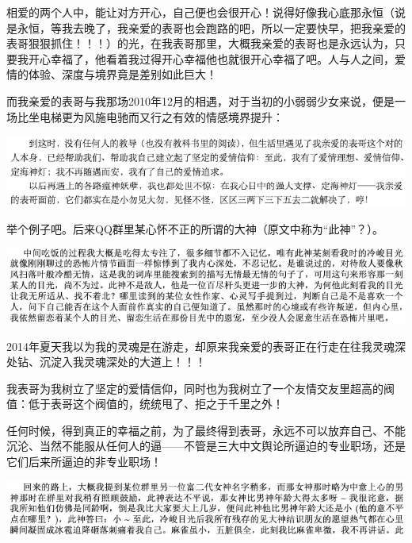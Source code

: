 \documentclass[9pt, b5paper]{article}
\begin{document}
相爱的两个人中，能让对方开心，自己便也会很开心！说得好像我心底那永恒（说是永恒，等我去晚了，我亲爱的表哥也会跑路的吧，所以一定要快早，把我亲爱的表哥狠狠抓住！！！）的光，在我表哥那里，大概我亲爱的表哥也是永远认为，只要我开心幸福了，他看着我过得开心幸福他也就很开心幸福了吧。人与人之间，爱情的体验、深度与境界竟是差别如此巨大！

而我亲爱的表哥与我那场2010年12月的相遇，对于当初的小弱弱少女来说，便是一场比坐电梯更为风施电驰而又行之有效的情感境界提升：

\begin{center}
\includegraphics[width=.9\linewidth]{./pic/backups_plans_20210508_084808.png}
\end{center}

举个例子吧。后来QQ群里某心怀不正的所谓的大神（原文中称为“此神”？）。

\begin{center}
\includegraphics[width=.9\linewidth]{./pic/backups_plans_20210422_090949.png}
\end{center}

2014年夏天我以为我的灵魂是在游走，却原来我亲爱的表哥正在行走在往我灵魂深处钻、沉淀入我灵魂深处的大道上！！！

我表哥为我树立了坚定的爱情信仰，同时也为我树立了一个友情交友里超高的阀值：低于表哥这个阀值的，统统甩了、拒之于千里之外！

任何时候，得到真正的幸福之前，为了最终得到表哥，永远不可以放弃自己、不能沉沦、当然不能服从任何人的逼——不管是三大中文舆论所逼迫的专业职场，还是它们后来所逼迫的非专业职场！

\begin{center}
\includegraphics[width=.9\linewidth]{./pic/backups_plans_20210422_091109.png}
\end{center}
\end{document}
